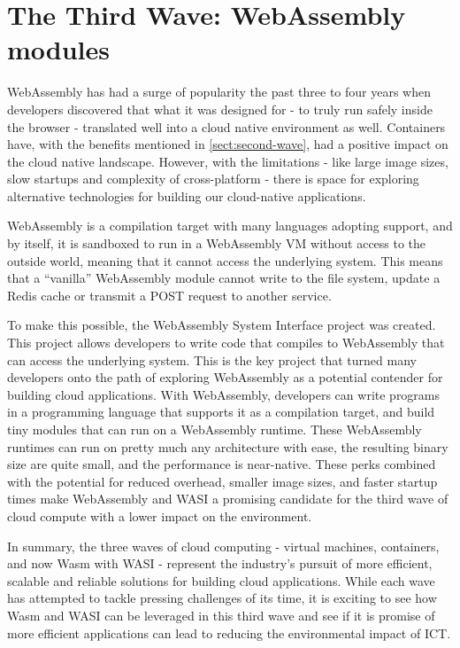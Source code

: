 \documentclass[
  table]{report}
\begin{document}
\section{The Third Wave: WebAssembly modules}
\label{sect:third-wave}

WebAssembly has had a surge of popularity the past three to four years
when developers discovered that what it was designed for - to truly run
safely inside the browser - translated well into a cloud native
environment as well. Containers have, with the benefits mentioned in
\cref{sect:second-wave}, had a positive impact on the cloud native
landscape. However, with the limitations - like large image sizes, slow
startups and complexity of cross-platform - there is space for exploring
alternative technologies for building our cloud-native applications.

WebAssembly is a compilation target with many languages adopting
support, and by itself, it is sandboxed to run in a WebAssembly \ac{VM}
without access to the outside world, meaning that it cannot access the
underlying system. This means that a ``vanilla'' WebAssembly module
cannot write to the file system, update a Redis cache or transmit a POST
request to another service.

To make this possible, the WebAssembly System Interface project was
created. This project allows developers to write code that compiles to
WebAssembly that can access the underlying system. This is the key
project that turned many developers onto the path of exploring
WebAssembly as a potential contender for building cloud applications.
With WebAssembly, developers can write programs in a programming
language that supports it as a compilation target, and build tiny
modules that can run on a WebAssembly runtime. These WebAssembly
runtimes can run on pretty much any architecture with ease, the
resulting binary size are quite small, and the performance is
near-native. These perks combined with the potential for reduced
overhead, smaller image sizes, and faster startup times make WebAssembly
and \ac{WASI} a promising candidate for the third wave of cloud compute
with a lower impact on the environment.

In summary, the three waves of cloud computing - virtual machines,
containers, and now \ac{Wasm} with \ac{WASI} - represent the industry's
pursuit of more efficient, scalable and reliable solutions for building
cloud applications. While each wave has attempted to tackle pressing
challenges of its time, it is exciting to see how \ac{Wasm} and
\ac{WASI} can be leveraged in this third wave and see if it is promise
of more efficient applications can lead to reducing the environmental
impact of ICT.
\end{document}
